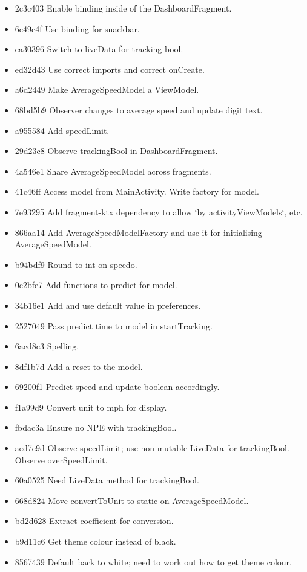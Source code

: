\documentclass[11pt, a4paper, notitlepage]{report}
\begin{document}
\begin{itemize}
	\item 2c3c403 Enable binding inside of the DashboardFragment. 
	\item 6c49c4f Use binding for snackbar. 
	\item ea30396 Switch to liveData for tracking bool. 
	\item ed32d43 Use correct imports and correct onCreate. 
	\item a6d2449 Make AverageSpeedModel a ViewModel. 
	\item 68bd5b9 Observer changes to average speed and update digit text. 
	\item a955584 Add speedLimit. 
	\item 29d23c8 Observe trackingBool in DashboardFragment. 
	\item 4a546e1 Share AverageSpeedModel across fragments. 
	\item 41c46ff Access model from MainActivity. Write factory for model. 
	\item 7e93295 Add fragment-ktx dependency to allow `by activityViewModels`, etc. 
	\item 866aa14 Add AverageSpeedModelFactory and use it for initialising AverageSpeedModel. 
	\item b94bdf9 Round to int on speedo. 
	\item 0c2bfe7 Add functions to predict for model. 
	\item 34b16e1 Add and use default value in preferences. 
	\item 2527049 Pass predict time to model in startTracking. 
	\item 6acd8c3 Spelling. 
	\item 8df1b7d Add a reset to the model. 
	\item 69200f1 Predict speed and update boolean accordingly. 
	\item f1a99d9 Convert unit to mph for display. 
	\item fbdac3a Ensure no NPE with trackingBool. 
	\item aed7c9d Observe speedLimit; use non-mutable LiveData for trackingBool. Observe overSpeedLimit. 
	\item 60a0525 Need LiveData method for trackingBool. 
	\item 668d824 Move convertToUnit to static on AverageSpeedModel. 
	\item bd2d628 Extract coefficient for conversion. 
	\item b9d11c6 Get theme colour instead of black. 
	\item 8567439 Default back to white; need to work out how to get theme colour. 

\end{itemize}
\end{document}
